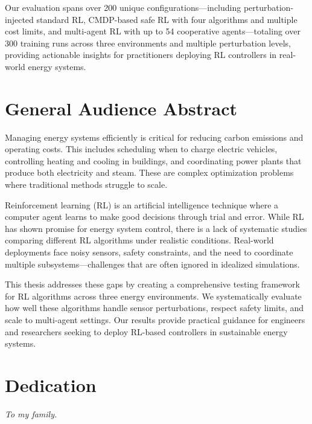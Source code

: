 \documentclass[12pt, letterpaper]{report}
\begin{document}
Our evaluation spans over 200 unique configurations---including perturbation-injected standard RL, CMDP-based safe RL with four algorithms and multiple cost limits, and multi-agent RL with up to 54 cooperative agents---totaling over 300 training runs across three environments and multiple perturbation levels, providing actionable insights for practitioners deploying RL controllers in real-world energy systems.

\chapter*{General Audience Abstract}

Managing energy systems efficiently is critical for reducing carbon emissions and operating costs. This includes scheduling when to charge electric vehicles, controlling heating and cooling in buildings, and coordinating power plants that produce both electricity and steam. These are complex optimization problems where traditional methods struggle to scale.

Reinforcement learning (RL) is an artificial intelligence technique where a computer agent learns to make good decisions through trial and error. While RL has shown promise for energy system control, there is a lack of systematic studies comparing different RL algorithms under realistic conditions. Real-world deployments face noisy sensors, safety constraints, and the need to coordinate multiple subsystems---challenges that are often ignored in idealized simulations.

This thesis addresses these gaps by creating a comprehensive testing framework for RL algorithms across three energy environments. We systematically evaluate how well these algorithms handle sensor perturbations, respect safety limits, and scale to multi-agent settings. Our results provide practical guidance for engineers and researchers seeking to deploy RL-based controllers in sustainable energy systems.

\chapter*{Dedication}
\vspace*{2in}
\begin{center}
\textit{To my family.}
\end{center}
\end{document}
